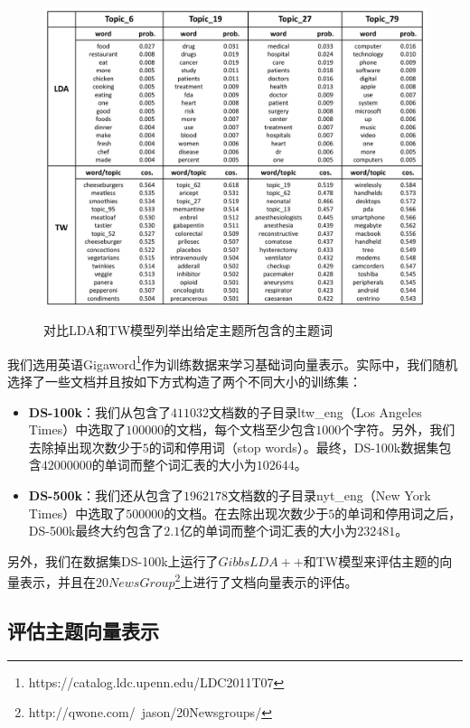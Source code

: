 \documentclass[master]{njuthesis}
\begin{document}
\begin{figure}[t]
  \centering
  \includegraphics[width= 1.0\textwidth]{figures//topic_words_chap4.pdf}\\
  \caption{对比LDA和TW模型列举出给定主题所包含的主题词}\label{fig:topic_words_chap4}
\end{figure}

我们选用英语Gigaword\footnote{https://catalog.ldc.upenn.edu/LDC2011T07}作为训练数据来学习基础词向量表示。实际中，我们随机选择了一些文档并且按如下方式构造了两个不同大小的训练集：

\begin{itemize}
\item \textbf{DS-100k}：我们从包含了$411032$文档数的子目录ltw\_eng（Los Angeles Times）中选取了$100000$的文档，每个文档至少包含$1000$个字符。另外，我们去除掉出现次数少于$5$的词和停用词（stop words）。最终，DS-100k数据集包含$42000000$的单词而整个词汇表的大小为$102644$。
\item \textbf{DS-500k}：我们还从包含了$1962178$文档数的子目录nyt\_eng（New York Times）中选取了$500000$的文档。在去除出现次数少于$5$的单词和停用词之后，DS-500k最终大约包含了$2.1$亿的单词而整个词汇表的大小为$232481$。
\end{itemize}
另外，我们在数据集DS-100k上运行了$GibbsLDA++$和TW模型来评估主题的向量表示，并且在$20NewsGroup$\footnote{http://qwone.com/~jason/20Newsgroups/}上进行了文档向量表示的评估。

\subsection{评估主题向量表示}\label{subsec_evaluate_topic_chap4}
\end{document}
